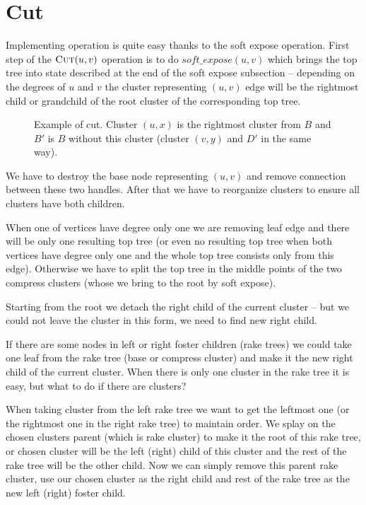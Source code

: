 \section{Cut}

Implementing \Cut{} operation is quite easy thanks to the soft expose operation.
First step of the $\hbox{\sc Cut}(u,v)$ operation is to do $soft\_expose(u,v)$ which brings
the top tree into state described at the end of the soft expose subsection
-- depending on the degrees of $u$ and $v$ the cluster representing
$(u,v)$ edge will be the rightmost child or grandchild of the root cluster of the
corresponding top tree.

\begin{figure}[h]
\centering
{}
\caption[Example of cut]
{Example of cut. Cluster $(u,x)$ is the rightmost cluster from $B$ and
$B'$ is $B$ without this cluster (cluster $(v,y)$ and $D'$ in the same way).}
\end{figure}

We have to destroy the base node representing $(u,v)$ and remove connection
between these two handles. After that we have to reorganize clusters to ensure
all clusters have both children.

When one of vertices have degree only one we are removing leaf edge and there
will be only one resulting top tree (or even no resulting top tree when both
vertices have degree only one and the whole top tree consists only from this
edge). Otherwise we have to split the top tree in the middle points of the two
compress clusters (whose we bring to the root by soft expose).

Starting from the root we detach the right child of the current cluster -- but
we could not leave the cluster in this form, we need to find new right child.

If there are some nodes in left or right foster children (rake trees) we could
take one leaf from the rake tree (base or compress cluster) and make it the new
right child of the current cluster. When there is only one cluster in the rake
tree it is easy, but what to do if there are clusters?

When taking cluster from the left rake tree we want to get the leftmost one
(or the rightmost one in the right rake tree) to maintain order. We splay on
the chosen clusters parent (which is rake cluster) to make it the root of this
rake tree, or chosen cluster will be the left (right) child of this cluster and
the rest of the rake tree will be the other child. Now we can simply remove this
parent rake cluster, use our chosen cluster as the right child and rest of the
rake tree as the new left (right) foster child.

